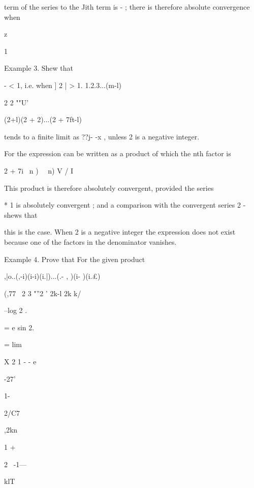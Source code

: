 term of the series to the Jith term is - ; there is therefore absolute convergence when 

z 

1 



Example 3. Shew that 



- < 1, i.e. when ] 2 | > 1. 
1.2.3...(m-l) 



2 2  ""U' 



(2+l)(2 + 2)...(2 + 7ft-l) 

tends to a finite limit as ??j- -x , unless 2 is a negative integer. 

For the expression can be written as a product of which the nth factor is 

2 + 7i \ n ) ~\ n) V  / I 

This product is therefore absolutely convergent, provided the series 

* 1 
is absolutely convergent ; and a comparison with the convergent series 2 -  shews that 

this is the case. When 2 is a negative integer the expression does not exist because one of 
the factors in the denominator vanishes. 



Example 4. Prove that 
For the given product 

,|o..(,-i)(i-i)(i.|)...(.- , )(i-  )(i.£) 

(,77 \ 2 3  "''2  '  2k-l 2k k/ 



--log 2 . 

= e   sin 2. 



= lim 



X 2 1 - - e 



 -27'  



1- 



2/C7 



,2kn 



1 + 



2 \ -1— 



klT 



